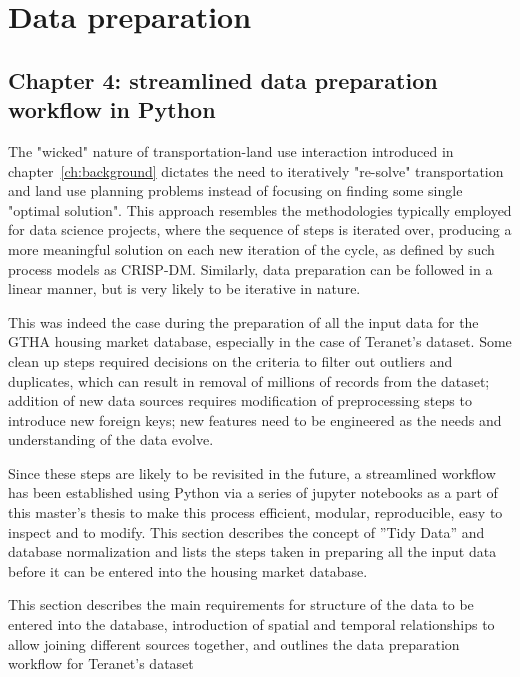 \chapter{Data preparation} \label{ch:data_preparation}

\section{Chapter 4: streamlined data preparation workflow in Python} \label{sec:data_preparation_intro}

The "wicked" nature of transportation-land use interaction introduced in chapter~\ref{ch:background} dictates the need to iteratively "re-solve" transportation and land use planning problems instead of focusing on finding some single "optimal solution".
This approach resembles the methodologies typically employed for data science projects, where the sequence of steps is iterated over, producing a more meaningful solution on each new iteration of the cycle, as defined by such process models as CRISP-DM\cite{Shearer2000}.
Similarly, data preparation can be followed in a linear manner, but is very likely to be iterative in nature\cite{Brownlee2013}.

This was indeed the case during the preparation of all the input data for the GTHA housing market database, especially in the case of Teranet's dataset.
Some clean up steps required decisions on the criteria to filter out outliers and duplicates, which can result in removal of millions of records from the dataset;
addition of new data sources requires modification of preprocessing steps to introduce new foreign keys;
new features need to be engineered as the needs and understanding of the data evolve.

Since these steps are likely to be revisited in the future, a streamlined workflow has been established using Python via a series of jupyter notebooks as a part of this master's thesis to make this process efficient, modular, reproducible, easy to inspect and to modify.
This section describes the concept of ''Tidy Data'' and database normalization and lists the steps taken in preparing all the input data before it can be entered into the housing market database.

This section describes the main requirements for structure of the data to be entered into the database, introduction of spatial and temporal relationships to allow joining different sources together, and outlines the data preparation workflow for Teranet's dataset

